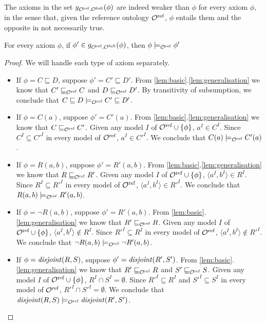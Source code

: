 \documentclass[
]{ceurart}
\begin{document}
The axioms in the set $g_{{\mathcal{O}^\textnormal{ref}},{\mathcal{O}^\textnormal{full}}}(\phi)$ are indeed weaker than $\phi$ for every axiom $\phi$, in the sense that, given the reference ontology ${\mathcal{O}^\textnormal{ref}}$, $\phi$ entails them and the opposite in not necessarily true.

\begin{lemma} \label{lem:weaker}
  For every \SROIQ axiom $\phi$, if $\phi' \in g_{{\mathcal{O}^\textnormal{ref}},{\mathcal{O}^\textnormal{full}}}(\phi)$, then $\phi \models_{\mathcal{O}^\textnormal{ref}} \phi'$
\end{lemma}

\begin{proof} We will handle each type of axiom separately.
  \begin{itemize}
    \item If $\phi = C \sqsubseteq D$, suppose $\phi' = C' \sqsubseteq D'$. From \cref{lem:basic}.\ref{lem:generalisation} we know that $C' \sqsubseteq_{\mathcal{O}^\textnormal{ref}} C$ and $D \sqsubseteq_{\mathcal{O}^\textnormal{ref}} D'$. By transitivity of subsumption, we conclude that $C \sqsubseteq D \models_{\mathcal{O}^\textnormal{ref}} C' \sqsubseteq D'$.
    \item If $\phi = C(a)$, suppose $\phi' = C'(a)$. From \cref{lem:basic}.\ref{lem:generalisation} we know that $C \sqsubseteq_{\mathcal{O}^\textnormal{ref}} C'$. Given any model $I$ of ${\mathcal{O}^\textnormal{ref}} \cup \{ \phi \}$, $a^I \in C^I$. Since $C^I \subseteq C'^I$ in every model of ${\mathcal{O}^\textnormal{ref}}$, $a^I \in C'^I$. We conclude that $C(a) \models_{\mathcal{O}^\textnormal{ref}} C'(a)$.
    \item If $\phi = R(a, b)$, suppose $\phi' = R'(a, b)$. From \cref{lem:basic}.\ref{lem:generalisation} we know that $R \sqsubseteq_{\mathcal{O}^\textnormal{ref}} R'$. Given any model $I$ of ${\mathcal{O}^\textnormal{ref}} \cup \{ \phi \}$, $\langle a^I, b^I \rangle \in R^I$. Since $R^I \subseteq R'^I$ in every model of ${\mathcal{O}^\textnormal{ref}}$, $\langle a^I, b^I \rangle \in R'^I$. We conclude that $R(a, b) \models_{\mathcal{O}^\textnormal{ref}} R'(a, b)$.
    \item If $\phi = \lnot R(a, b)$, suppose $\phi' = R'(a, b)$. From \cref{lem:basic}.\ref{lem:generalisation} we know that $R' \sqsubseteq_{\mathcal{O}^\textnormal{ref}} R$. Given any model $I$ of ${\mathcal{O}^\textnormal{ref}} \cup \{ \phi \}$, $\langle a^I, b^I \rangle \not\in R^I$. Since $R'^I \subseteq R^I$ in every model of ${\mathcal{O}^\textnormal{ref}}$, $\langle a^I, b^I \rangle \not\in R'^I$. We conclude that $\lnot R(a, b) \models_{\mathcal{O}^\textnormal{ref}} \lnot R'(a, b)$.
    \item If $\phi = \mathit{disjoint}(R, S)$, suppose $\phi' = \mathit{disjoint}(R', S')$. From \cref{lem:basic}.\ref{lem:generalisation} we know that $R' \sqsubseteq_{\mathcal{O}^\textnormal{ref}} R$ and $S' \sqsubseteq_{\mathcal{O}^\textnormal{ref}} S$. Given any model $I$ of ${\mathcal{O}^\textnormal{ref}} \cup \{ \phi \}$, $R^I \cap S^I = \emptyset$. Since $R'^I \subseteq R^I$ and $S'^I \subseteq S^I$ in every model of ${\mathcal{O}^\textnormal{ref}}$, $R'^I \cap S'^I = \emptyset$. We conclude that $\mathit{disjoint}(R, S) \models_{\mathcal{O}^\textnormal{ref}} \mathit{disjoint}(R', S')$.

\end{itemize}
\end{proof}
\end{document}
